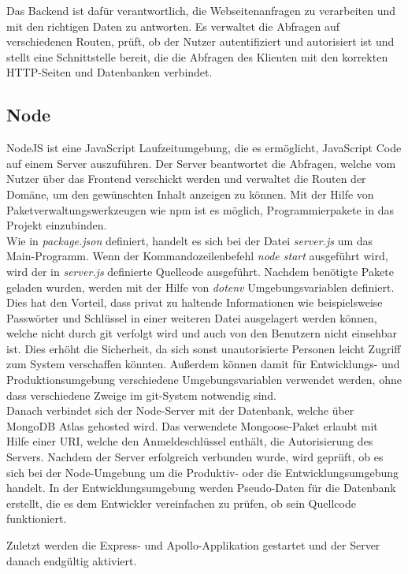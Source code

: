 Das Backend ist dafür verantwortlich, die Webseitenanfragen zu verarbeiten und mit den richtigen Daten zu antworten. Es verwaltet die Abfragen auf verschiedenen Routen, prüft, ob der Nutzer autentifiziert und autorisiert ist und stellt eine Schnittstelle bereit, die die Abfragen des Klienten mit den korrekten HTTP-Seiten und Datenbanken verbindet.

\subsection{Node}
NodeJS ist eine JavaScript Laufzeitumgebung, die es ermöglicht, JavaScript Code auf einem Server auszuführen. Der Server beantwortet die Abfragen, welche vom Nutzer über das Frontend verschickt werden und verwaltet die Routen der Domäne, um den gewünschten Inhalt anzeigen zu können. Mit der Hilfe von Paketverwaltungswerkzeugen wie npm ist es möglich, Programmierpakete in das Projekt einzubinden.\\

Wie in \textit{package.json} definiert, handelt es sich bei der Datei \textit{server.js} um das Main-Programm. Wenn der Kommandozeilenbefehl \textit{node start} ausgeführt wird, wird der in \textit{server.js} definierte Quellcode ausgeführt.
Nachdem benötigte Pakete geladen wurden, werden mit der Hilfe von \textit{dotenv} Umgebungsvariablen definiert. Dies hat den Vorteil, dass privat zu haltende Informationen wie beispielsweise Passwörter und Schlüssel in einer weiteren Datei ausgelagert werden können, welche nicht durch git verfolgt wird und auch von den Benutzern nicht einsehbar ist. Dies erhöht die Sicherheit, da sich sonst unautorisierte Personen leicht Zugriff zum System verschaffen könnten. Außerdem können damit für Entwicklungs- und Produktionsumgebung verschiedene Umgebungsvariablen verwendet werden, ohne dass verschiedene Zweige im git-System notwendig sind.\\

Danach verbindet sich der Node-Server mit der Datenbank, welche über MongoDB Atlas gehosted wird. Das verwendete Mongoose-Paket erlaubt mit Hilfe einer URI, welche den Anmeldeschlüssel enthält, die Autorisierung des Servers. Nachdem der Server erfolgreich verbunden wurde, wird geprüft, ob es sich bei der Node-Umgebung um die Produktiv- oder die Entwicklungsumgebung handelt. In der Entwicklungsumgebung werden Pseudo-Daten für die Datenbank erstellt, die es dem Entwickler vereinfachen zu prüfen, ob sein Quellcode funktioniert.

Zuletzt werden die Express- und Apollo-Applikation gestartet und der Server danach endgültig aktiviert.


